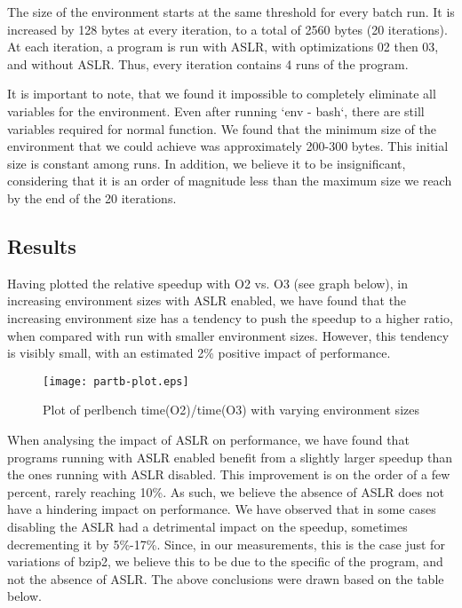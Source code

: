 \documentclass{article}
\begin{document}
The size of the environment starts at the same threshold for every batch run. It is increased by 128 bytes at every iteration, to a total of 2560 bytes (20 iterations). At each iteration, a program is run with ASLR, with optimizations 02 then 03, and without ASLR. Thus, every iteration contains 4 runs of the program.

It is important to note, that we found it impossible to completely eliminate all variables for the environment. Even after running `env - bash`, there are still variables required for normal function. We found that the minimum size of the environment that we could achieve was approximately 200-300 bytes. This initial size is constant among runs. In addition, we believe it to be insignificant, considering that it is an order of magnitude less than the maximum size we reach by the end of the 20 iterations.


\subsection{Results}

Having plotted the relative speedup with O2 vs. O3 (see graph below), in increasing environment sizes with ASLR enabled, we have found that the increasing environment size has a tendency to push the speedup to a higher ratio, when compared with run with smaller environment sizes. However, this tendency is visibly small, with an estimated 2\% positive impact of performance.

\begin{figure}[h]
	\begin{center}
		\texttt{[image: partb-plot.eps]}
	\end{center}		
  \caption{Plot of perlbench time(O2)/time(O3) with varying environment sizes}
\end{figure}

When analysing the impact of ASLR on performance, we have found that programs running with ASLR enabled benefit from a slightly larger speedup than the ones running with ASLR disabled. This improvement is on the order of a few percent, rarely reaching 10\%. As such, we believe the absence of ASLR does not have a hindering impact on performance. We have observed that in some cases disabling the ASLR had a detrimental impact on the speedup, sometimes decrementing it by 5\%-17\%. Since, in our measurements, this is the case just for variations of bzip2, we believe this to be due to the specific of the program, and not the absence of ASLR. The above conclusions were drawn based on the table below.
\end{document}
